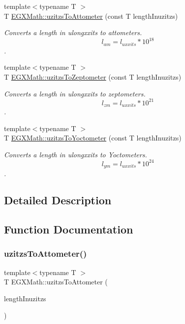 \begin{DoxyCompactItemize}
{\footnotesize template$<$typename T $>$ }\\T \mbox{\hyperlink{group___e_g_x_math-_conversions-_length_conversions-uzitzs-_s_i_ga33c3f00e9fadcd52f2c0bfbd71a33d2b}{E\+G\+X\+Math\+::uzitzs\+To\+Attometer}} (const T length\+Inuzitzs)
\begin{DoxyCompactList}\small\item\em Converts a length in ulongxxits to attometers. \[ l_{am}=l_{uxxits} * 10^{18} \]. \end{DoxyCompactList}\item 
{\footnotesize template$<$typename T $>$ }\\T \mbox{\hyperlink{group___e_g_x_math-_conversions-_length_conversions-uzitzs-_s_i_ga9057f57c3f49216e6272c6f0f29ded62}{E\+G\+X\+Math\+::uzitzs\+To\+Zeptometer}} (const T length\+Inuzitzs)
\begin{DoxyCompactList}\small\item\em Converts a length in ulongxxits to zeptometers. \[ l_{zm}=l_{uxxits} * 10^{21} \]. \end{DoxyCompactList}\item 
{\footnotesize template$<$typename T $>$ }\\T \mbox{\hyperlink{group___e_g_x_math-_conversions-_length_conversions-uzitzs-_s_i_gae0faf7639d852bfde8863b3615aa096a}{E\+G\+X\+Math\+::uzitzs\+To\+Yoctometer}} (const T length\+Inuzitzs)
\begin{DoxyCompactList}\small\item\em Converts a length in ulongxxits to Yoctometers. \[ l_{ym}=l_{uxxits} * 10^{24} \]. \end{DoxyCompactList}\end{DoxyCompactItemize}


\subsection{Detailed Description}


\subsection{Function Documentation}
\mbox{\label{group___e_g_x_math-_conversions-_length_conversions-uzitzs-_s_i_ga33c3f00e9fadcd52f2c0bfbd71a33d2b}} 
\subsubsection{\texorpdfstring{uzitzs\+To\+Attometer()}{uzitzsToAttometer()}}
{\footnotesize\ttfamily template$<$typename T $>$ \\
T E\+G\+X\+Math\+::uzitzs\+To\+Attometer (\begin{DoxyParamCaption}\item[{const T}]{length\+Inuzitzs }\end{DoxyParamCaption})}



